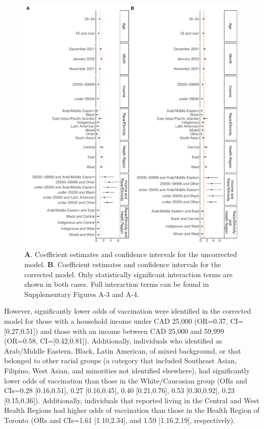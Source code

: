 \documentclass[
]{article}
\begin{document}
\begin{figure}

\includegraphics{main_files/figure-pdf/fig-models-1.pdf} \hfill{}

\caption{\label{fig-models}\textbf{A}. Coefficient estimates and
confidence intervals for the uncorrected model. \textbf{B}. Coefficient
estimates and confidence intervals for the corrected model. Only
statistically significant interaction terms are shown in both cases.
Full interaction terms can be found in Supplementary Figures A-3 and
A-4.}

\end{figure}

However, significantly lower odds of vaccination were identified in the
corrected model for those with a household income under CAD 25,000
(OR=0.37, CI={[}0.27,0.51{]}) and those with an income between CAD
25,000 and 59,999 (OR=0.58, CI={[}0.42,0.81{]}). Additionally,
individuals who identified as Arab/Middle Eastern, Black, Latin
American, of mixed background, or that belonged to other racial groups
(a category that included Southeast Asian, Filipino, West Asian, and
minorities not identified elsewhere), had significantly lower odds of
vaccination than those in the White/Caucasian group (ORs and CIs=0.28
{[}0.16,0.51{]}, 0.27 {[}0.16,0.45{]}, 0.40 {[}0.21,0.76{]}, 0.53
{[}0.30,0.92{]}, 0.23 {[}0.15,0.36{]}). Additionally, individuals that
reported living in the Central and West Health Regions had higher odds
of vaccination than those in the Health Region of Toronto (ORs and
CIs=1.61 {[}1.10,2.34{]}, and 1.59 {[}1.16,2.19{]}, respectively).
\end{document}
